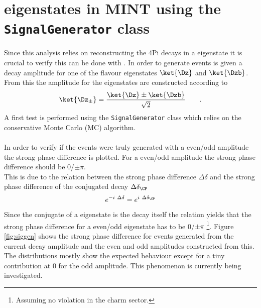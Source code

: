 \section{\CP eigenstates in MINT using the \texttt{SignalGenerator} class}
Since this analysis relies on reconstructing the \DTo4Pi decays in a \CP eigenstate it is crucial to verify this can be done with \mint. In order to generate events \mint is given a decay amplitude for one of the flavour eigenstates $\ket{\Dz}$ and $\ket{\Dzb}$. From this the amplitude for the \CP eigenstates \ket{\Dz_{\pm}} are constructed according to
\begin{equation}
\ket{\Dz_{\pm}} =\frac{ \ket{\Dz} \pm \ket{\Dzb}}{\sqrt2} \qquad .
\end{equation}
A first test is performed using the \texttt{SignalGenerator} class which relies on the conservative Monte Carlo (MC) algorithm. \\
\\
In order to verify if the events were truly generated with a \CP even/odd amplitude the strong phase difference is plotted. For a \CP even/odd amplitude the strong phase difference should be 0/$\pm \pi$.\\
This is due to the relation between the strong phase difference $\Delta \delta$ and the strong phase difference of the \CP conjugated decay $\Delta \delta_{\CP} $
\begin{equation}
e^{- i\ \Delta \delta} = e^{ i\ \Delta \delta_{\CP}}
\end{equation}
Since the \CP conjugate of a \CP eigenstate is the decay itself the relation yields that the strong phase difference for a \CP even/odd eigenstate has to be 0/$\pm \pi$ \footnote{Assuming no \CP violation in the charm sector.}. Figure \ref{fig:siggen} shows the strong phase difference for events generated from the current \Dz decay amplitude and the \CP even and \CP odd amplitudes constructed from this. The distributions mostly show the expected behaviour except for a tiny contribution at 0 for the \CP odd amplitude. This phenomenon is currently being investigated.
